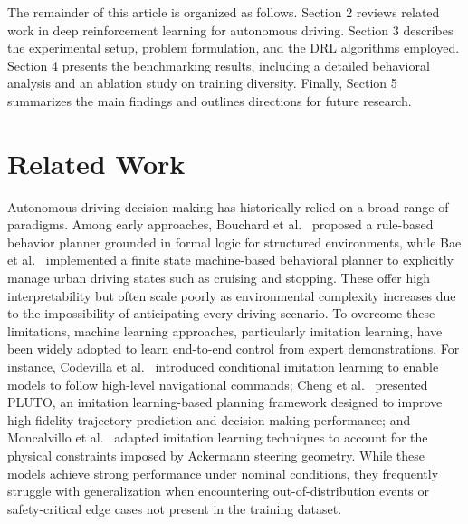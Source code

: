 \documentclass[]{interact}
\begin{document}
The remainder of this article is organized as follows. Section 2 reviews related work in deep reinforcement learning for autonomous driving. Section 3 describes the experimental setup, problem formulation, and the DRL algorithms employed. Section 4 presents the benchmarking results, including a detailed behavioral analysis and an ablation study on training diversity. Finally, Section 5 summarizes the main findings and outlines directions for future research.

\section{Related Work}

Autonomous driving decision-making has historically relied on a broad range of paradigms. Among early approaches, Bouchard et al.~\cite{bouchard2015rulebased} proposed a rule-based behavior planner grounded in formal logic for structured environments, while Bae et al.~\cite{bae2020fsm} implemented a finite state machine-based behavioral planner to explicitly manage urban driving states such as cruising and stopping. These offer high interpretability but often scale poorly as environmental complexity increases due to the impossibility of anticipating every driving scenario. To overcome these limitations, machine learning approaches, particularly imitation learning, have been widely adopted to learn end-to-end control from expert demonstrations. For instance, Codevilla et al.~\cite{codevilla2018il} introduced conditional imitation learning to enable models to follow high-level navigational commands; Cheng et al.~\cite{cheng2023pluto} presented PLUTO, an imitation learning-based planning framework designed to improve high-fidelity trajectory prediction and decision-making performance; and Moncalvillo et al.~\cite{moncalvillo2024ackermann} adapted imitation learning techniques to account for the physical constraints imposed by Ackermann steering geometry. While these models achieve strong performance under nominal conditions, they frequently struggle with generalization when encountering out-of-distribution events or safety-critical edge cases not present in the training dataset.
\end{document}
